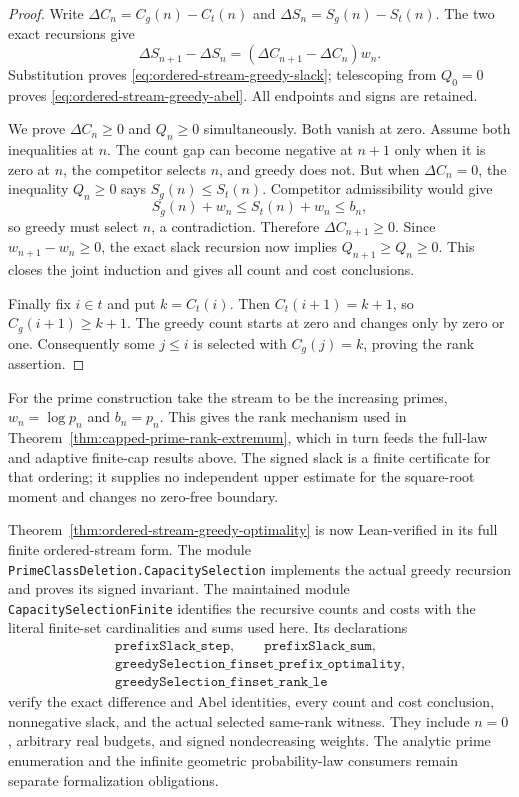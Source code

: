 \documentclass[11pt]{article}
\theoremstyle{definition}
\begin{document}
\begin{proof}
Write $\Delta C_n=C_g(n)-C_t(n)$ and
$\Delta S_n=S_g(n)-S_t(n)$.
The two exact recursions give
\[
 \Delta S_{n+1}-\Delta S_n
       =(\Delta C_{n+1}-\Delta C_n)w_n .
\]
Substitution proves
\eqref{eq:ordered-stream-greedy-slack}; telescoping from $Q_0=0$
proves \eqref{eq:ordered-stream-greedy-abel}.  All endpoints
and signs are retained.

We prove $\Delta C_n\ge0$ and $Q_n\ge0$ simultaneously.
Both vanish at zero.  Assume both inequalities at $n$.
The count gap can become negative at $n+1$ only when it is
zero at $n$, the competitor selects $n$, and greedy does not.
But when $\Delta C_n=0$, the inequality $Q_n\ge0$ says
$S_g(n)\le S_t(n)$.  Competitor admissibility would give
\[
 S_g(n)+w_n\le S_t(n)+w_n\le b_n,
\]
so greedy must select $n$, a contradiction.  Therefore
$\Delta C_{n+1}\ge0$.  Since $w_{n+1}-w_n\ge0$, the exact
slack recursion now implies $Q_{n+1}\ge Q_n\ge0$.
This closes the joint induction and gives all count and cost
conclusions.

Finally fix $i\in t$ and put $k=C_t(i)$.
Then $C_t(i+1)=k+1$, so $C_g(i+1)\ge k+1$.
The greedy count starts at zero and changes only by zero or
one.  Consequently some $j\le i$ is selected with
$C_g(j)=k$, proving the rank assertion.
\end{proof}

For the prime construction take the stream to be the increasing
primes, $w_n=\log p_n$ and $b_n=p_n$.
This gives the rank mechanism used in
Theorem~\ref{thm:capped-prime-rank-extremum}, which in turn
feeds the full-law and adaptive finite-cap results above.
The signed slack is a finite certificate for that ordering;
it supplies no independent upper estimate for the square-root
moment and changes no zero-free boundary.

Theorem~\ref{thm:ordered-stream-greedy-optimality} is now
Lean-verified in its full finite ordered-stream form.
The module
\texttt{PrimeClassDeletion.}\allowbreak\texttt{CapacitySelection}
implements the actual greedy recursion and proves its signed invariant.
The maintained module
\texttt{CapacitySelectionFinite} identifies the recursive counts and costs
with the literal finite-set cardinalities and sums used here.
Its declarations
\[
 \begin{gathered}
 \texttt{prefixSlack\_step},\qquad \texttt{prefixSlack\_sum},\\
 \texttt{greedySelection\_finset\_prefix\_optimality},\\
 \texttt{greedySelection\_finset\_rank\_le}
 \end{gathered}
\]
verify the exact difference and Abel identities, every count and cost
conclusion, nonnegative slack, and the actual selected same-rank witness.
They include $n=0$, arbitrary real budgets, and signed nondecreasing weights.
The analytic prime enumeration and the infinite geometric
probability-law consumers remain separate formalization obligations.
\end{document}
